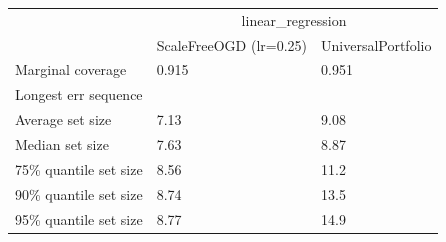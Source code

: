 \begin{tabular}{lll}
\toprule
& \multicolumn{2}{c}{linear_regression} \\
& ScaleFreeOGD (lr=0.25) & UniversalPortfolio \\
\midrule
Marginal coverage & 0.915 & 0.951 \\
Longest err sequence &  &  \\
Average set size & 7.13 & 9.08 \\
Median set size & 7.63 & 8.87 \\
75\% quantile set size & 8.56 & 11.2 \\
90\% quantile set size & 8.74 & 13.5 \\
95\% quantile set size & 8.77 & 14.9 \\
\bottomrule
\end{tabular}
